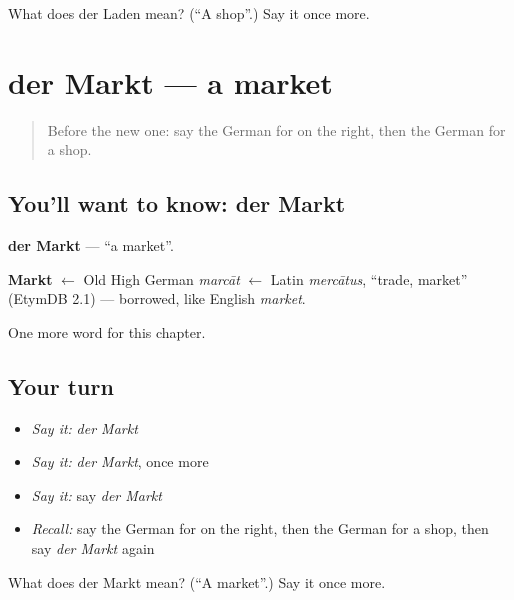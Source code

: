 \begin{tcolorbox}[breakable,colback=teal!4,colframe=teal!35!black,title={Before you move on}]
What does der Laden mean? (\textquotedblleft{}A shop\textquotedblright{}.) Say it once more.
\end{tcolorbox}
\section[der Markt]{der Markt — a market}

\label{lesson:GE-C96-markt}



\begin{quote}
Before the new one: say the German for on the right, then the German for a shop.
\end{quote}

\subsection*{You'll want to know: der Markt}
\textbf{der Markt} — \textquotedblleft{}a market\textquotedblright{}.

\begin{cousinweb}
\textbf{Markt} $\leftarrow$ Old High German \emph{marcāt} $\leftarrow$ Latin \emph{mercātus}, \textquotedblleft{}trade, market\textquotedblright{} (EtymDB 2.1) — borrowed, like English \emph{market}.
\end{cousinweb}

\begin{grammarlens}[title={What you've built}]
One more word for this chapter.
\end{grammarlens}

\subsection*{Your turn}
\begin{itemize}
\raggedright
  \item \emph{Say it:} \emph{der Markt}
  \item \emph{Say it:} \emph{der Markt}, once more
  \item \emph{Say it:} say \emph{der Markt}
  \item \emph{Recall:} say the German for on the right, then the German for a shop, then say \emph{der Markt} again
\end{itemize}

\begin{tcolorbox}[breakable,colback=teal!4,colframe=teal!35!black,title={Before you move on}]
What does der Markt mean? (\textquotedblleft{}A market\textquotedblright{}.) Say it once more.
\end{tcolorbox}
